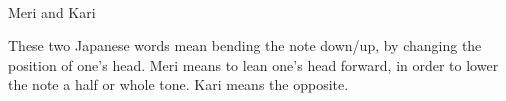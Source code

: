 ﻿　　　　　　　　　　　　　　　　　　　　　　　　　　　　　　　　　　　　　　　　　　　　　　　　　　　　　　　　Meri and Kari 

These two Japanese words mean bending the note down/up, by changing the position of one’s head. 
Meri means to lean one’s head forward, in order to lower the note a half or whole tone. Kari means the opposite.

